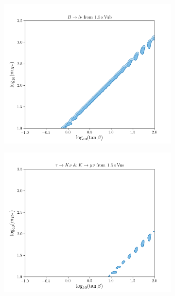 \documentclass[11pt]{article}
\begin{document}
\begin{figure}[H]
\begin{subfigure}[b]{0.45\textwidth}
        \includegraphics[width=\textwidth]{vub/Blnu1.5.png}
    \end{subfigure}
    \begin{subfigure}[b]{0.45\textwidth}
        \includegraphics[width=\textwidth]{vus/Klnu1.5.png}
    \end{subfigure}
\end{figure}
\end{document}
